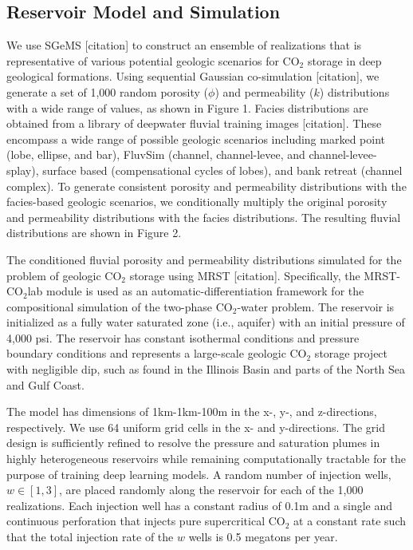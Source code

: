 \documentclass[default,iicol]{sn-jnl}
\begin{document}
\subsection{Reservoir Model and Simulation}\label{subsec2_res_modsim}
We use SGeMS [citation] to construct an ensemble of realizations that is representative of various potential geologic scenarios for CO$_2$ storage in deep geological formations. Using sequential Gaussian co-simulation [citation], we generate a set of 1,000 random porosity ($\phi$) and permeability ($k$) distributions with a wide range of values, as shown in Figure 1. Facies distributions are obtained from a library of deepwater fluvial training images [citation]. These encompass a wide range of possible geologic scenarios including marked point (lobe, ellipse, and bar), FluvSim (channel, channel-levee, and channel-levee-splay), surface based (compensational cycles of lobes), and bank retreat (channel complex). To generate consistent porosity and permeability distributions with the facies-based geologic scenarios, we conditionally multiply the original porosity and permeability distributions with the facies distributions. The resulting fluvial distributions are shown in Figure 2. 

The conditioned fluvial porosity and permeability distributions simulated for the problem of geologic CO$_2$ storage using MRST [citation]. Specifically, the MRST-CO$_2$lab module is used as an automatic-differentiation framework for the compositional simulation of the two-phase CO$_2$-water problem. The reservoir is initialized as a fully water saturated zone (i.e., aquifer) with an initial pressure of 4,000 psi. The reservoir has constant isothermal conditions and pressure boundary conditions and represents a large-scale geologic CO$_2$ storage project with negligible dip, such as found in the Illinois Basin and parts of the North Sea and Gulf Coast. 

The model has dimensions of 1km-1km-100m in the x-, y-, and z-directions, respectively. We use 64 uniform grid cells in the x- and y-directions. The grid design is sufficiently refined to resolve the pressure and saturation plumes in highly heterogeneous reservoirs while remaining computationally tractable for the purpose of training deep learning models. A random number of injection wells, $w \in [1,3]$, are placed randomly along the reservoir for each of the 1,000 realizations. Each injection well has a constant radius of 0.1m and a single and continuous perforation that injects pure supercritical CO$_2$ at a constant rate such that the total injection rate of the $w$ wells is 0.5 megatons per year.
\end{document}
